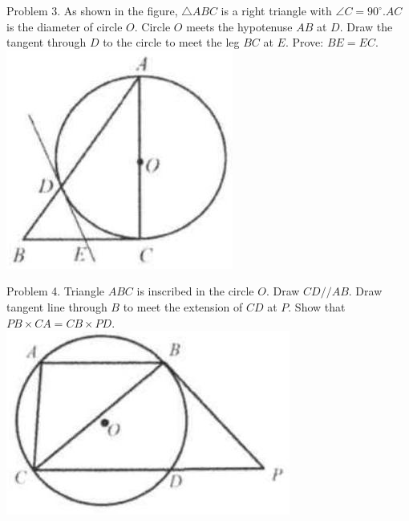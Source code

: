 \documentclass[10pt]{article}
\begin{document}
Problem 3. As shown in the figure, \(\triangle A B C\) is a right triangle with \(\angle C=90^{\circ} . A C\) is the diameter of circle \(O\). Circle \(O\) meets the hypotenuse \(A B\) at \(D\). Draw the tangent through \(D\) to the circle to meet the leg \(B C\) at \(E\). Prove: \(B E=E C\).\\
\includegraphics[max width=\textwidth, center]{2025_04_17_97bc1f7e44d93c271a88g-169(3)}

Problem 4. Triangle \(A B C\) is inscribed in the circle \(O\). Draw \(C D / / A B\). Draw tangent line through \(B\) to meet the extension of \(C D\) at \(P\). Show that \(P B \times C A=C B \times P D\).\\
\includegraphics[max width=\textwidth, center]{2025_04_17_97bc1f7e44d93c271a88g-169}
\end{document}
